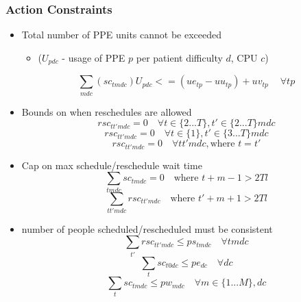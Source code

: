 \documentclass{article}
\begin{document}
\subsubsection{Action Constraints}
\begin{itemize}
    \item Total number of PPE units cannot be exceeded  
    \begin{itemize}
    		\item ($U_{pdc}$ - usage of PPE $p$ per patient difficulty $d$, CPU $c$)
    \end{itemize}
        \begin{equation} 
			\sum_{mdc}(sc_{tmdc})U_{pdc} <= (ue_{tp} - uu_{tp}) + uv_{tp}\ \quad \forall tp
		\end{equation}
	
	\item Bounds on when reschedules are allowed
		\begin{equation}  
			rsc_{tt'mdc} = 0 \quad \forall t \in \{ 2...T \}, t' \in \{2...T\} mdc 
		\end{equation} 
		\begin{equation}  
			rsc_{tt'mdc} = 0 \quad \forall t \in \{ 1 \}, t'\in \{ 3...T \} mdc 
		\end{equation} 
		\begin{equation}  
			rsc_{tt'mdc} = 0 \quad \forall tt'mdc, \text{where } t=t' 
		\end{equation} 

	\item Cap on max schedule/reschedule wait time
		\begin{equation}  
			\sum_{tmdc} sc_{tmdc} = 0 \quad \text{where } t+m-1 > 2Tl 
		\end{equation} 
		\begin{equation}  
			\sum_{tt'mdc} rsc_{tt'mdc} \quad \text{where } t'+m+1 > 2Tl 
		\end{equation} 

	\item number of people scheduled/rescheduled must be consistent
		\begin{equation}  
			\sum_{t'} rsc_{tt'mdc} \le ps_{tmdc} \quad \forall tmdc 
		\end{equation} 
		\begin{equation}  
			\sum_{t} sc_{t0dc} \le pe_{dc} \quad \forall dc 
		\end{equation} 
		\begin{equation}  
			\sum_{t} sc_{tmdc} \le pw_{mdc} \quad \forall m \in \{1...M \}, dc 
		\end{equation} 

\end{itemize}
\end{document}

